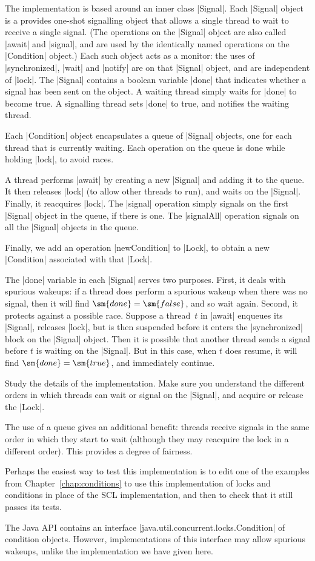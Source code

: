 
The implementation is based around an inner class |Signal|.  Each |Signal|
object is a provides one-shot signalling object that allows a single thread to
wait to receive a single signal.  (The operations on the |Signal| object are
also called |await| and |signal|, and are used by the identically named
operations on the |Condition| object.)  Each such object acts as a monitor:
the uses of |synchronized|, |wait| and |notify| are on that |Signal| object,
and are independent of |lock|.  The |Signal| contains a boolean variable
|done| that indicates whether a signal has been sent on the object.  A waiting
thread simply waits for |done| to become true.  A signalling thread sets
|done| to true, and notifies the waiting thread.

Each |Condition| object encapsulates a queue of |Signal| objects, one for each
thread that is currently waiting.  Each operation on the queue is done while
holding |lock|, to avoid races.

A thread performs |await| by creating a new |Signal| and adding it to the
queue.  It then releases |lock| (to allow other threads to run), and waits on
the |Signal|.  Finally, it reacquires |lock|.  The |signal| operation simply
signals on the first |Signal| object in the queue, if there is one.  The
|signalAll| operation signals on all the |Signal| objects in the queue.

Finally, we add an operation |newCondition| to |Lock|, to obtain a new
|Condition| associated with that |Lock|.

The |done| variable in each |Signal| serves two purposes.  First, it deals
with spurious wakeups: if a thread does perform a spurious wakeup when there
was no signal, then it will find $\sm{done} = \sm{false}$, and so wait again.
Second, it protects against a possible race.  Suppose a thread~$t$ in |await|
enqueues its |Signal|, releases |lock|, but is then suspended before it enters
the |synchronized| block on the |Signal| object.  Then it is possible that
another thread sends a signal before $t$ is waiting on the |Signal|.  But in
this case, when $t$ does resume, it will find $\sm{done} = \sm{true}$, and
immediately continue.

\begin{instruction}
Study the details of the implementation.  Make sure you understand the
different orders in which threads can wait or signal on the |Signal|, and
acquire or release the |Lock|. 
\end{instruction}

The use of a queue gives an additional benefit: threads receive signals
in the same order in which they start to wait (although they may reacquire the
lock in a different order).  This provides a degree of fairness. 

Perhaps the easiest way to test this implementation is to edit one of the
examples from Chapter~\ref{chap:conditions} to use this implementation of
locks and conditions in place of the SCL implementation, and then to check
that it still passes its tests.

The Java API contains an interface |java.util.concurrent.locks.Condition| of
condition objects.  However, implementations of this interface may allow
spurious wakeups, unlike the implementation we have given here.
